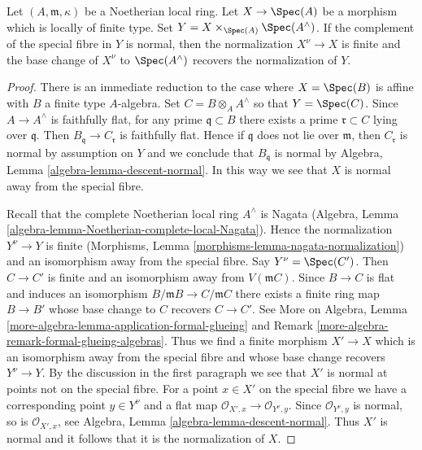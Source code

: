 \begin{lemma}
\label{lemma-normalization-completion}
Let $(A, \mathfrak m, \kappa)$ be a Noetherian local ring.
Let $X \to \Spec(A)$ be a morphism which is locally of finite type.
Set $Y = X \times_{\Spec(A)} \Spec(A^\wedge)$.
If the complement of the special fibre in $Y$ is normal, then
the normalization $X^\nu \to X$ is finite and the base change
of $X^\nu$ to $\Spec(A^\wedge)$ recovers the normalization of $Y$.
\end{lemma}

\begin{proof}
There is an immediate reduction to the case where $X = \Spec(B)$
is affine with $B$ a finite type $A$-algebra. Set $C = B \otimes_A A^\wedge$
so that $Y = \Spec(C)$. Since
$A \to A^\wedge$ is faithfully flat, for any prime $\mathfrak q \subset B$
there exists a prime $\mathfrak r \subset C$ lying over $\mathfrak q$.
Then $B_\mathfrak q \to C_\mathfrak r$ is faithfully flat. Hence if
$\mathfrak q$ does not lie over $\mathfrak m$, then $C_\mathfrak r$
is normal by assumption on $Y$ and we conclude that $B_\mathfrak q$
is normal by Algebra, Lemma \ref{algebra-lemma-descent-normal}.
In this way we see that $X$ is normal away from the special fibre.

\medskip\noindent
Recall that the complete Noetherian local ring $A^\wedge$ is Nagata
(Algebra, Lemma \ref{algebra-lemma-Noetherian-complete-local-Nagata}).
Hence the normalization $Y^\nu \to Y$ is finite
(Morphisms, Lemma \ref{morphisms-lemma-nagata-normalization})
and an isomorphism away from the special fibre. Say $Y^\nu = \Spec(C')$.
Then $C \to C'$ is finite and an isomorphism away from $V(\mathfrak m C)$.
Since $B \to C$ is flat and induces an isomorphism
$B/\mathfrak m B \to C/\mathfrak m C$ there exists a finite
ring map $B \to B'$ whose base change to $C$ recovers $C \to C'$.
See More on Algebra, Lemma
\ref{more-algebra-lemma-application-formal-glueing} and
Remark \ref{more-algebra-remark-formal-glueing-algebras}.
Thus we find a finite morphism $X' \to X$ which is an isomorphism
away from the special fibre and whose base change recovers $Y^\nu \to Y$.
By the discussion in the first paragraph we see that $X'$ is normal at
points not on the special fibre. For a point $x \in X'$ on the special
fibre we have a corresponding point $y \in Y^\nu$ and a flat map
$\mathcal{O}_{X', x} \to \mathcal{O}_{Y^\nu, y}$.
Since $\mathcal{O}_{Y^\nu, y}$ is normal, so is $\mathcal{O}_{X', x}$, see
Algebra, Lemma \ref{algebra-lemma-descent-normal}.
Thus $X'$ is normal and it follows that it is the normalization of $X$.
\end{proof}

